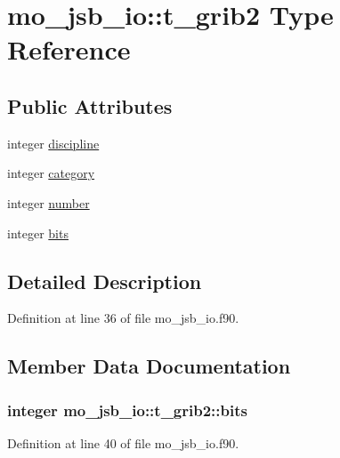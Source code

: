\hypertarget{structmo__jsb__io_1_1t__grib2}{}\section{mo\+\_\+jsb\+\_\+io\+:\+:t\+\_\+grib2 Type Reference}
\label{structmo__jsb__io_1_1t__grib2}
\subsection*{Public Attributes}
\begin{DoxyCompactItemize}
\item 
integer \hyperlink{structmo__jsb__io_1_1t__grib2_a6d04e119119126e03f70302404322e9e}{discipline}
\item 
integer \hyperlink{structmo__jsb__io_1_1t__grib2_a63807a398f2470394f9dd992291e068c}{category}
\item 
integer \hyperlink{structmo__jsb__io_1_1t__grib2_a64b203ca59562151da1e7b55913cb31c}{number}
\item 
integer \hyperlink{structmo__jsb__io_1_1t__grib2_af4fdd6be16edccc4e500109eea891db4}{bits}
\end{DoxyCompactItemize}


\subsection{Detailed Description}


Definition at line 36 of file mo\+\_\+jsb\+\_\+io.\+f90.



\subsection{Member Data Documentation}
\hypertarget{structmo__jsb__io_1_1t__grib2_af4fdd6be16edccc4e500109eea891db4}{}
\subsubsection[{bits}]{\setlength{\rightskip}{0pt plus 5cm}integer mo\+\_\+jsb\+\_\+io\+::t\+\_\+grib2\+::bits}\label{structmo__jsb__io_1_1t__grib2_af4fdd6be16edccc4e500109eea891db4}


Definition at line 40 of file mo\+\_\+jsb\+\_\+io.\+f90.


